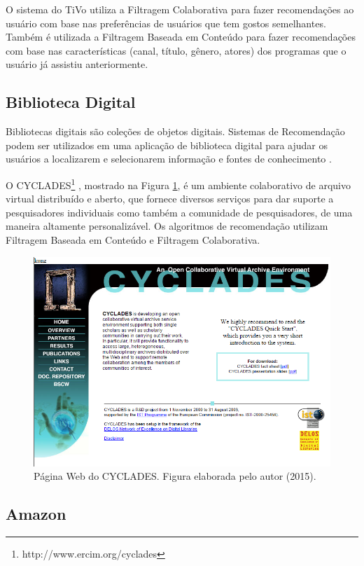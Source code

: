 O sistema do TiVo utiliza a Filtragem Colaborativa para fazer recomendações ao usuário com base nas preferências de usuários que tem gostos semelhantes. Também é utilizada a Filtragem Baseada em Conteúdo para fazer recomendações com base nas características (canal, título, gênero, atores) dos programas que o usuário já assistiu anteriormente.

\subsection{Biblioteca Digital}

Bibliotecas digitais são coleções de objetos digitais. Sistemas de Recomendação podem ser utilizados em uma aplicação de biblioteca digital para ajudar os usuários a localizarem e selecionarem informação e fontes de conhecimento \citep{Porcel:2010:DII:1663649.1663728}.

O CYCLADES\footnote{http://www.ercim.org/cyclades} \citep{rendaIPM05}, mostrado na Figura \ref{fig:cyclades}, é um ambiente colaborativo de arquivo virtual distribuído e aberto, que fornece diversos serviços para dar suporte a pesquisadores individuais como também a comunidade de pesquisadores, de uma maneira altamente personalizável. Os algoritmos de recomendação utilizam Filtragem Baseada em Conteúdo e Filtragem Colaborativa.


\begin{figure}
	\centering
	\includegraphics[scale=0.65]{imagens/cyclades.png}
	\caption{Página Web do CYCLADES. Figura elaborada pelo autor (2015).}
	\label{fig:cyclades}
\end{figure} 


\subsection{Amazon}

